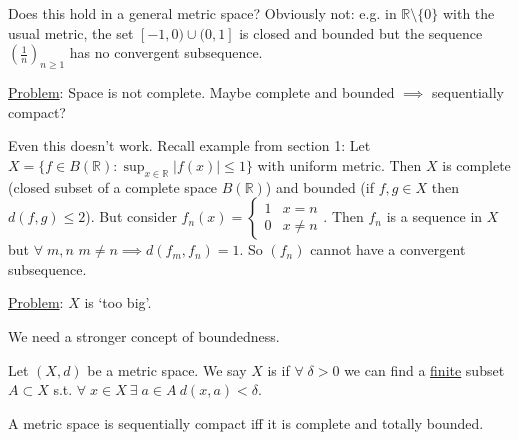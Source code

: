 \begin{remark}
    Does this hold in a general metric space?
    Obviously not: e.g. in $\mathbb{R} \setminus \{0\}$ with the usual metric, the set $[-1, 0) \cup (0, 1]$ is closed and bounded but the sequence $(\frac{1}{n})_{n \geq 1}$ has no convergent subsequence.
\end{remark} 


\underline{Problem}: Space is not complete.
Maybe complete and bounded $\implies$ sequentially compact?

Even this doesn't work.
Recall example from section 1:
Let $X = \{f \in B(\mathbb{R}) :  \sup_{x \in \mathbb{R}} |f(x)| \leq 1\}$ with uniform metric.
Then $X$ is complete (closed subset of a complete space $B(\mathbb{R})$) and bounded (if $f, g \in X$ then $d(f, g) \leq 2$).
But consider $f_n(x) = \begin{cases}
    1 & x = n \\
    0 & x \neq n
\end{cases}$.
Then $f_n$ is a sequence in $X$ but $\forall \; m, n$ $m \neq n \implies d(f_m, f_n) = 1$.
So $(f_n)$ cannot have a convergent subsequence.

\underline{Problem}: $X$ is `too big'.

We need a stronger concept of boundedness.

\begin{definition}
    Let $(X, d)$ be a metric space.
    We say $X$ is  if $\forall \; \delta > 0$ we can find a \underline{finite} subset $A \subset X$ s.t. $\forall \; x \in X \ \exists \; a \in A \ d(x, a) < \delta$.
\end{definition} 

\begin{theorem} \label{thm:21}
    A metric space is sequentially compact iff it is complete and totally bounded.
\end{theorem} 

